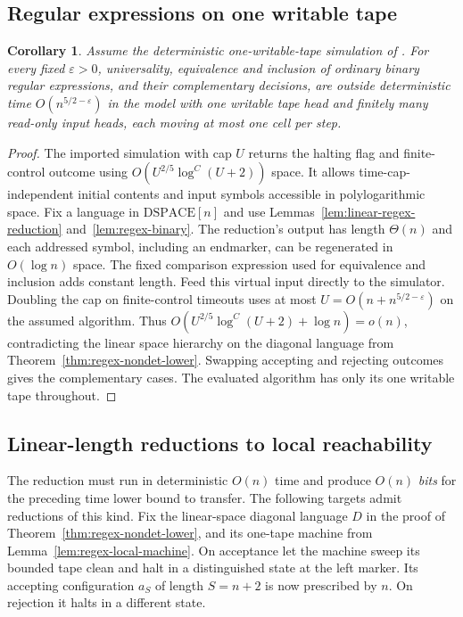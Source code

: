 \documentclass[11pt]{article}
\newtheorem{corollary}[theorem]{Corollary}
\theoremstyle{definition}
\theoremstyle{remark}
\begin{document}
\subsection{Regular expressions on one writable tape}\label{sec:regex-one-tape}
\begin{corollary}
Assume the deterministic one-writable-tape simulation of
\cite{OneTapeSpace}. For every fixed $\varepsilon>0$, universality,
equivalence and inclusion of ordinary binary regular expressions, and
their complementary decisions, are outside deterministic time
$O(n^{5/2-\varepsilon})$ in the model with one writable tape head and
finitely many read-only input heads, each moving at most one cell
per step.
\end{corollary}
\begin{proof}
The imported simulation with cap $U$ returns the halting flag and
finite-control outcome using $O(U^{2/5}\log^C(U+2))$ space. It allows
time-cap-independent initial contents and input symbols accessible in
polylogarithmic space. Fix a language in $\mathrm{DSPACE}[n]$ and use
Lemmas~\ref{lem:linear-regex-reduction} and~\ref{lem:regex-binary}.
The reduction's output has length $\Theta(n)$ and each addressed
symbol, including an endmarker, can be regenerated in $O(\log n)$
space. The fixed comparison expression used for equivalence and
inclusion adds constant length. Feed this virtual input directly to
the simulator. Doubling the cap on finite-control timeouts uses at
most $U=O(n+n^{5/2-\varepsilon})$ on the assumed algorithm. Thus
$O(U^{2/5}\log^C(U+2)+\log n)=o(n)$, contradicting the linear
space hierarchy on the diagonal language from
Theorem~\ref{thm:regex-nondet-lower}. Swapping accepting and rejecting
outcomes gives the complementary cases. The evaluated algorithm has
only its one writable tape throughout.
\end{proof}

\subsection{Linear-length reductions to local reachability}\label{sec:local-targets}
The reduction must run in deterministic $O(n)$ time and produce
$O(n)$ \emph{bits} for the preceding time lower bound to transfer. The
following targets admit reductions of this kind. Fix the linear-space
diagonal language $D$ in the proof of Theorem~\ref{thm:regex-nondet-lower},
and its one-tape machine from Lemma~\ref{lem:regex-local-machine}.
On acceptance let the machine sweep its bounded tape clean and halt
in a distinguished state at the left marker. Its accepting configuration
$a_S$ of length $S=n+2$ is now prescribed by $n$. On rejection it
halts in a different state.
\end{document}
